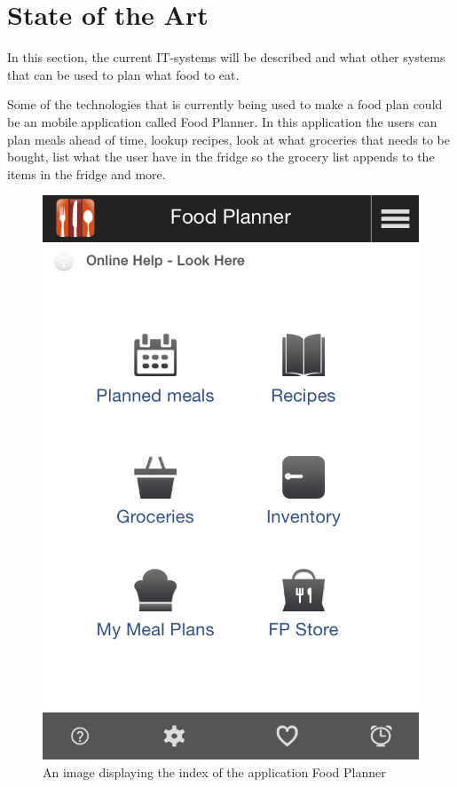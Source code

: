 \section{State of the Art}
In this section, the current IT-systems will be described and what other systems that can be used to plan what food to eat.

Some of the technologies that is currently being used to make a food plan could be an mobile application called Food Planner.
In this application the users can plan meals ahead of time, lookup recipes, look at what groceries that needs to be bought,
list what the user have in the fridge so the grocery list appends to the items in the fridge and more.

\begin{figure}[H]
    \centering
    \includegraphics[width=\textwidth]{Grafik/FoodPlanner/index}
    \caption{An image displaying the index of the application Food Planner}
    \label{FoodPlannerIndex}
\end{figure}

